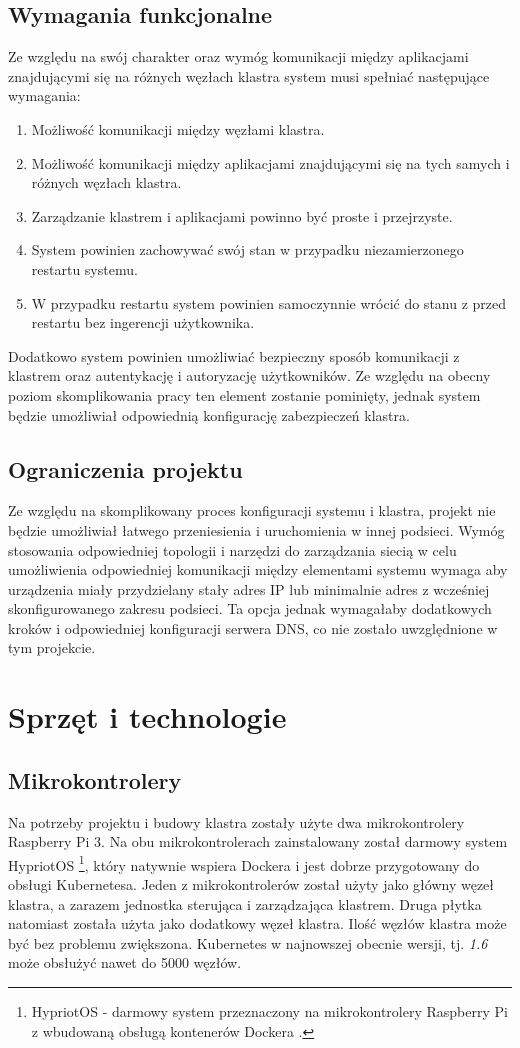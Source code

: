 \documentclass[12pt]{report}
\let\Oldsection\section
\renewcommand{\section}{\FloatBarrier\Oldsection}
\let\Oldsubsection\subsection
\renewcommand{\subsection}{\FloatBarrier\Oldsubsection}
\begin{document}
{\subsection{Wymagania funkcjonalne}
Ze względu na swój charakter oraz wymóg komunikacji między aplikacjami znajdują\-cymi się na różnych węzłach klastra system musi spełniać następujące wymagania:

\begin{enumerate}
\item{Możliwość komunikacji między węzłami klastra.}
\item{Możliwość komunikacji między aplikacjami znajdującymi się na tych samych i różnych węzłach klastra.}
\item{Zarządzanie klastrem i aplikacjami powinno być proste i przejrzyste.}
\item{System powinien zachowywać swój stan w przypadku niezamierzonego restartu systemu.}
\item{W przypadku restartu system powinien samoczynnie wrócić do stanu z przed restartu bez ingerencji użytkownika.}
\end{enumerate}

Dodatkowo system powinien umożliwiać bezpieczny sposób komunikacji z klastrem oraz autentykację i autoryzację użytkowników. Ze względu na obecny poziom skomplikowania pracy ten element zostanie pominięty, jednak system będzie umożliwiał odpowiednią konfigurację zabezpieczeń klastra.
\subsection{Ograniczenia projektu}
Ze względu na skomplikowany proces konfiguracji systemu i klastra, projekt nie będzie umożliwiał łatwego przeniesienia i uruchomienia w innej podsieci. Wymóg stosowania odpowiedniej topologii i narzędzi do zarządzania siecią w celu umożliwienia odpowiedniej komunikacji między elementami systemu wymaga aby urządzenia miały przydzielany stały adres IP lub minimalnie adres z wcześniej skonfigurowanego zakresu podsieci. Ta opcja jednak wymagałaby dodatkowych kroków i odpowiedniej konfiguracji serwera DNS, co nie zostało uwzględnione w tym projekcie.

\section{Sprzęt i technologie}
\subsection{Mikrokontrolery}
Na potrzeby projektu i budowy klastra zostały użyte dwa mikrokontrolery Raspberry Pi 3. Na obu mikrokontrolerach zainstalowany został darmowy system HypriotOS \footnote{HypriotOS - darmowy system przeznaczony na mikrokontrolery Raspberry Pi z wbudowaną obsługą kontenerów Dockera \cite{hypriotos}.}, który natywnie wspiera Dockera i jest dobrze przygotowany do obsługi Kubernetesa. Jeden z mikrokontrolerów został użyty jako główny węzeł klastra, a zarazem jednostka sterująca i zarządzająca klastrem. Druga płytka natomiast została użyta jako dodatkowy węzeł klastra. Ilość węzłów klastra może być bez problemu zwiększona. Kubernetes w najnowszej obecnie wersji, tj. \textit{1.6} może obsłużyć nawet do 5000 węzłów. 
}
\end{document}
